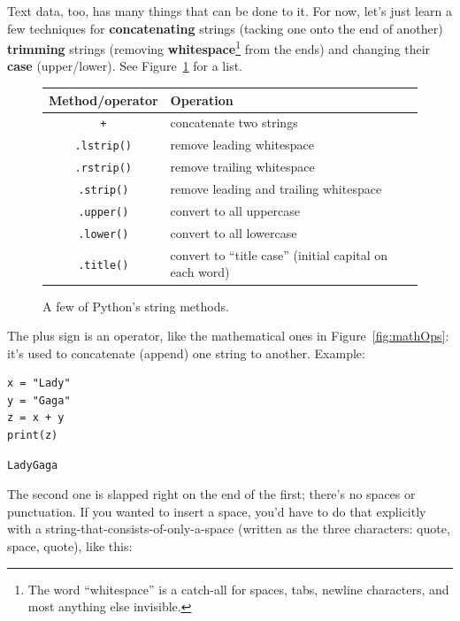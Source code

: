 Text data, too, has many things that can be done to it. For now, let's just
learn a few techniques for \textbf{concatenating} strings (tacking one onto the
end of another) \textbf{trimming} strings (removing
\textbf{whitespace}\footnote{The word ``whitespace'' is a catch-all for spaces,
tabs, newline characters, and most anything else invisible.} from the ends) and
changing their \textbf{case} (upper/lower). See Figure~\ref{fig:stringOps} for
a list.

\begin{figure}[ht]
\centering
\begin{tabular}{c | l}
\hline
Method/operator & Operation \\
\hline
\texttt{+} & concatenate two strings \\
\texttt{.lstrip()} & remove leading whitespace \\
\texttt{.rstrip()} & remove trailing whitespace \\
\texttt{.strip()} & remove leading and trailing whitespace \\
\texttt{.upper()} & convert to all uppercase \\
\texttt{.lower()} & convert to all lowercase \\
\texttt{.title()} & convert to ``title case'' (initial capital on each word) \\
\hline
\end{tabular}
\smallskip
\caption{A few of Python's string methods.}
\label{fig:stringOps}
\end{figure}

The plus sign is an operator, like the mathematical ones in
Figure~\ref{fig:mathOps}: it's used to concatenate (append) one string to
another. Example:

\begin{Verbatim}[fontsize=\small,samepage=true,frame=single,framesep=3mm]
x = "Lady"
y = "Gaga"
z = x + y
print(z)
\end{Verbatim}

\begin{Verbatim}[fontsize=\small,samepage=true,frame=leftline,framesep=5mm,framerule=1mm]
LadyGaga
\end{Verbatim}

The second one is slapped right on the end of the first; there's no spaces or
punctuation. If you wanted to insert a space, you'd have to do that explicitly
with a string-that-consists-of-only-a-space (written as the three characters:
quote, space, quote), like this:

